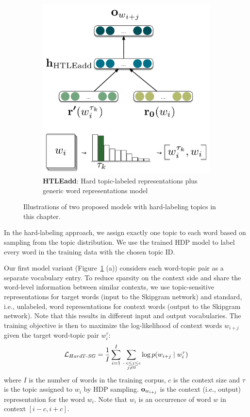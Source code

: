 \begin{figure}[ht!]
\begin{subfigure}[t]{0.315\textwidth}
\includegraphics[width=\linewidth]{03-research-01/figs/fig2.pdf}
\caption{\textbf{HTLEadd}: Hard topic-labeled representations plus generic word representations model}
\end{subfigure}
\caption{Illustrations of two proposed models with hard-labeling topics in this chapter. \label{modelsfigH}}
\end{figure}

In the hard-labeling approach, we assign exactly one topic to each word based on sampling from the topic distribution.
We use the trained HDP model to label every word in the training data with the chosen topic ID.

Our first model variant (Figure~\ref{modelsfigH} (a)) considers each word-topic pair as a separate vocabulary entry.
To reduce sparsity on the context side and share the word-level information between similar contexts, we use topic-sensitive representations for target words (input to the Skipgram network) and standard, i.e., unlabeled, word representations for context words (output to the Skipgram network). Note that this results in different input and output vocabularies.
The training objective is then to maximize the log-likelihood of context words $w_{i+j}$ given the target word-topic pair $w_{i}^{\tau}$:
%
\begin{align}\small
\mathcal{L}_{HardT\textrm{-}SG} = \frac{1}{I} \sum_{i=1}^I \sum_{\substack{-c \le j \le c \\ j \ne 0}}{\log p(w_{i+j} \mid w^{\tau}_{i})}
\end{align}
\noindent%
%
where $I$ is the number of %
words in the training corpus, $c$ is the context %
size and $\tau$ is the topic assigned to $w_i$ by HDP sampling.
$\bm{\mathbf{o}}_{w_{i+j}}$ is the context (i.e., output) representation for the word $w_i$.
Note that $w_i$ is an occurrence of word $w$ in context $[i-c, i+c]$.

